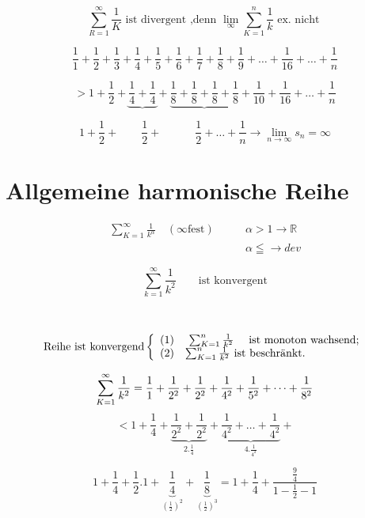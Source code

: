 

\begin{example}
	\[\sum_{R=1}^{\infty} \frac{1}{K} \text{ ist divergent ,denn  } \lim\limits_{\infty} \sum_{K=1}^{n} \frac{1}{k} \text{ ex. nicht } \]
	
	\[\frac{1}{1}+\frac{1}{2}+\frac{1}{3}+\frac{1}{4}+\frac{1}{5}+\frac{1}{6}+\frac{1}{7}+\frac{1}{8}+\frac{1}{9}+\dots+\frac{1}{16}+\dots+\frac{1}{n}\]
	
	\[ > 1+\frac{1}{2}+  \underbrace{\frac{1}{4}+\frac{1}{4}}+\underbrace{\frac{1}{8}+\frac{1}{8}+\frac{1}{8}+\frac{1}{8}}+\frac{1}{10}+\frac{1}{16}+\dots+\frac{1}{n}\] 
	
	\[1+\frac{1}{2} + \qquad \frac{1}{2}+   \quad  \qquad \frac{1}{2}  + \dots + \frac{1}{n}  \rightarrow \lim\limits_{n\rightarrow \infty }s_n = \infty \]
	
\end{example}
\section{Allgemeine harmonische Reihe}

				\begin{equation*}
				\begin{split}
				 \sum_{K=1}^{\infty} \frac{1}{k^\alpha} \quad( \infty \text{fest}) \qquad
				& \alpha > 1 \rightarrow \mathbb{R}  \\
				& \alpha \leqq \rightarrow dev
				\end{split}
				\end{equation*}
 \begin{example}
 	\[ \sum_{k=1}^{\infty} \frac{1}{k^2} \qquad \text{ist konvergent}
 	\] \\  \\
		\[ \text{Reihe ist konvergend} \left\{ \begin{array}{ll}
	   (1) & \mbox{ $\sum_{K=1}^{n} \frac{1}{k^2} $ \quad ist monoton wachsend};\\
	   (2) & \mbox{$\sum_{K=1}^{n} \frac{1}{k^2} $ \text{ist beschränkt}}.\end{array} \right. \] 
	   	
	   \[ \sum_{K=1}^{\infty} \frac{1}{k^2} = \frac{1}{1}+\frac{1}{2^2}+\frac{1}{2^2}+\frac{1}{4^2}+\frac{1}{5^2}+  \dots + \frac{1}{8^2}  \]
	   \[ <  1 + \frac{1}{4}+\underbrace{\frac{1}{2^2}+\frac{1}{2^2}}_{2. \frac{1}{4}}+\underbrace{\frac{1}{4^2}+\dots + \frac{1}{4^2}}_{4.\frac{1}{4^2}}+\]
	   
	   \[ 1+\frac{1}{4}+\frac{1}{2}.1+\underbrace{\frac{1}{4}}_{(\frac{1}{2})^2}+\underbrace{\frac{1}{8}}_{(\frac{1}{2})^3} =1+\frac{1}{4}+\frac{\frac{9}{4} }{1-\frac{1}{2}-1} \]
	   
 \end{example}
